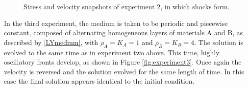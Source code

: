 \begin{figure}
\centerline{
}
\caption{Stress and velocity snapshots of experiment 2, in which shocks form.\label{fig:experiment2}}
\end{figure}

In the third experiment, the medium is taken to be periodic and piecewise
constant, composed of alternating homogeneous layers of materials A and B,
as described by \eqref{LYmedium}, with $\rho_A=K_A=1$ and $\rho_B=K_B=4$.
The solution is evolved to the same time as in experiment two above. %
This time, highly oscillatory fronts develop, as shown in Figure \ref{fig:experiment3}.
Once again the velocity is reversed and 
the solution evolved for the same length of time. %
In this case the final solution appears identical to the initial condition.


